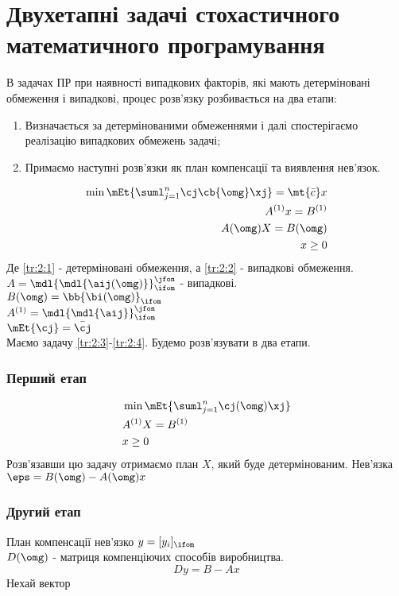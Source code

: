 \section{Двухетапні задачі стохастичного математичного програмування}
В задачах ПР при наявності випадкових факторів, які мають детерміновані обмеження і випадкові, процес розв’язку розбивається на два етапи:
\begin{enumerate}
\item Визначається за детермінованими обмеженнями і далі спостерігаємо реалізацію випадкових обмежень задачі;
\item Примаємо наступні розв’язки як план компенсації та виявлення нев’язок.
\end{enumerate}
\begin{eqnarray}
\min \mEt{ \suml_{j=1}^n \cj\cb{\omg} \xj} = \mt{\bar c} x\label{tr:2:3}\\
A^{(1)} x = B^{(1)} \label{tr:2:1}\\
A(\omg) X = B(\omg) \label{tr:2:2}\\
x\geq 0\label{tr:2:4}
\end{eqnarray}
Де \eqref{tr:2:1} - детерміновані обмеження, а \eqref{tr:2:2} - випадкові обмеження. 
$A=\mdl{\mdl{\aij(\omg)}}_{\ifom}^{\jfon}$ - випадкові.\\
$B(\omg) = \bb{ \bi(\omg)}_{\ifom}$\\
$A^{(1)} = \mdl{\mdl{\aij}}_{\ifom}^{\jfon}$\\
$\mEt{\cj} = \bar{\cj}$\\
Маємо задачу \eqref{tr:2:3}-\eqref{tr:2:4}. Будемо розв’язувати в два етапи.\\
\subsubsection{Перший етап}
\begin{eqnarray}
&\min\mEt{\suml_{j=1}^n \cj(\omg) \xj} \\
&A^{(1)} X = B^{(1)} \\
&x\geq 0 
\end{eqnarray}
Розв’язавши цю задачу отримаємо план $X$, який буде детермінованим. Нев’язка $\eps = B(\omg) - A(\omg) x$\\
\subsubsection{Другий етап}
План компенсації нев’язко $y=[y_i]_{\ifom}$\\
$D(\omg)$ - матриця компенціючих способів виробництва.\\
\begin{equation}
Dy = B-Ax
\end{equation}
Нехай вектор 